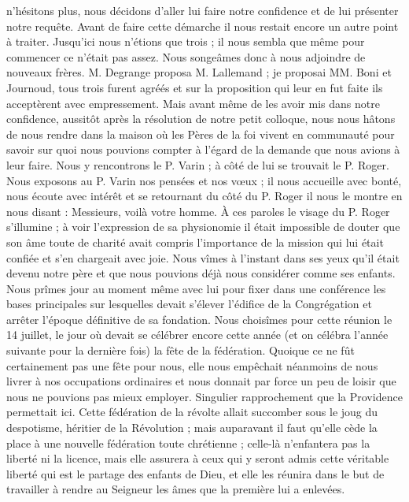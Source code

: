 n'hésitons plus, nous décidons d'aller lui faire notre confidence et de lui présenter notre requête. Avant de faire cette démarche il nous restait encore un autre point à traiter. Jusqu'ici nous n'étions que trois ; il nous sembla que même pour commencer ce n'était pas assez. Nous songeâmes donc à nous adjoindre de nouveaux frères. M. Degrange proposa M. Lallemand ; je proposai MM. Boni et Journoud, tous trois furent agréés et sur la proposition qui leur en fut faite ils acceptèrent avec empressement. Mais avant même de les avoir mis dans notre confidence, aussitôt après la résolution de notre petit colloque, nous nous hâtons de nous rendre dans la maison où les Pères de la foi vivent en communauté pour savoir sur quoi nous pouvions compter à l'égard de la demande que nous avions à leur faire. Nous y rencontrons le P. Varin ; à côté de lui se trouvait le P. Roger. Nous exposons au P. Varin nos pensées et nos vœux ; il nous accueille avec bonté, nous écoute avec intérêt et se retournant du côté du P. Roger il nous le montre en nous disant : Messieurs, voilà votre homme. À ces paroles le visage du P. Roger s'illumine ; à voir l'expression de sa physionomie il était impossible de douter que son âme toute de charité avait compris l'importance de la mission qui lui était confiée et s'en chargeait avec joie. Nous vîmes à l'instant dans ses yeux qu'il était devenu notre père et que nous pouvions déjà nous considérer comme ses enfants. Nous prîmes jour au moment même avec lui pour fixer dans une conférence les
bases principales sur lesquelles devait s'élever l'édifice de la Congrégation et arrêter l'époque définitive de sa fondation. Nous choisîmes pour cette réunion le 14 juillet, le jour où devait se célébrer encore cette année (et on célébra l'année suivante pour la dernière fois) la fête de la fédération. Quoique ce ne fût certainement pas une fête pour nous, elle nous empêchait néanmoins de nous livrer à nos occupations ordinaires et nous donnait par force un peu de loisir que nous ne pouvions pas mieux employer. Singulier rapprochement que la Providence permettait ici. Cette fédération de la révolte allait succomber sous le joug du despotisme, héritier de la Révolution ; mais auparavant il faut qu'elle cède la place à une nouvelle fédération toute chrétienne ; celle-là n'enfantera pas la liberté ni la licence, mais elle assurera à ceux qui y seront admis cette véritable liberté qui est le partage des enfants de Dieu, et elle les réunira dans le but de travailler à rendre au Seigneur les âmes que la première lui a enlevées.

